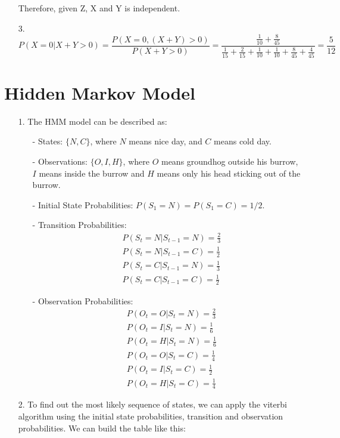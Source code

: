 \documentclass[11pt]{article}
\begin{document}
\begin{itemize}
Therefore, given Z, X and Y is independent.

\item[3.]
\begin{equation*}
P(X=0|X+Y>0)=\frac{P(X=0,(X+Y)>0)}{P(X+Y>0)}=\frac{\frac{1}{10}+\frac{8}{45}}{\frac{1}{15}+\frac{2}{15}+\frac{1}{10}+\frac{1}{10}+\frac{8}{45}+\frac{4}{45}}=\frac{5}{12}
\end{equation*}

\end{itemize}

\section{Hidden Markov Model}
\begin{itemize}
\item[1.]
The HMM model can be described as:
\begin{itemize}
\item[-]States: $\{N,C\}$, where $N$ means nice day, and $C$ means cold day.
\item[-]Observations: $\{O, I, H\}$, where $O$ means groundhog outside his burrow, $I$ means inside the burrow and $H$ means only his head sticking out of the burrow.
\item[-]Initial State Probabilities: $P(S_1=N)=P(S_1=C)=1/2$.
\item[-]Transition Probabilities:
\begin{align*}
& P(S_t=N|S_{t-1}=N)=\frac{2}{3} \\
& P(S_t=N|S_{t-1}=C)=\frac{1}{2} \\
& P(S_t=C|S_{t-1}=N)=\frac{1}{3} \\
& P(S_t=C|S_{t-1}=C)=\frac{1}{2} 
\end{align*}
\item[-]Observation Probabilities:
\begin{align*}
& P(O_t=O|S_t=N)=\frac{2}{3} \\
& P(O_t=I|S_t=N)=\frac{1}{6} \\
& P(O_t=H|S_t=N)=\frac{1}{6} \\
& P(O_t=O|S_t=C)=\frac{1}{4} \\
& P(O_t=I|S_t=C)=\frac{1}{2} \\
& P(O_t=H|S_t=C)=\frac{1}{4}
\end{align*}
\end{itemize}
\item[2.] To find out the most likely sequence of states, we can apply the viterbi algorithm using the initial state probabilities, transition and observation probabilities. We can build the table like this:

\end{itemize}
\end{document}
